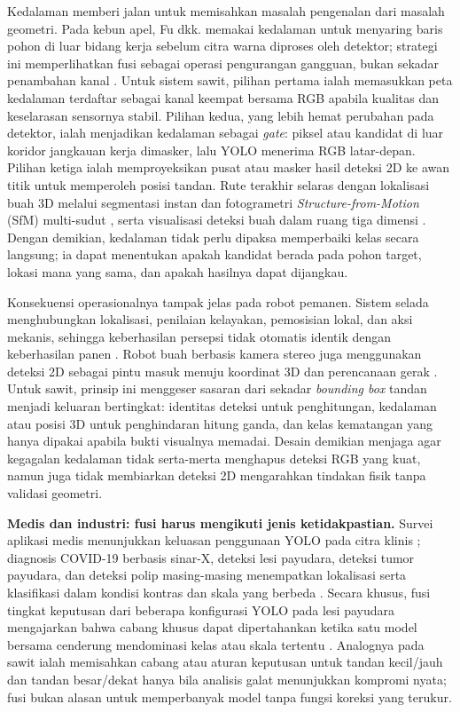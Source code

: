 Kedalaman memberi jalan untuk memisahkan masalah pengenalan dari masalah
geometri. Pada kebun apel, Fu dkk. memakai kedalaman untuk menyaring baris
pohon di luar bidang kerja sebelum citra warna diproses oleh detektor;
strategi ini memperlihatkan fusi sebagai operasi pengurangan gangguan,
bukan sekadar penambahan kanal \cite{fu2020apple}. Untuk sistem sawit,
pilihan pertama ialah memasukkan peta kedalaman terdaftar sebagai kanal
keempat bersama RGB apabila kualitas dan keselarasan sensornya stabil.
Pilihan kedua, yang lebih hemat perubahan pada detektor, ialah menjadikan
kedalaman sebagai \textit{gate}: piksel atau kandidat di luar koridor
jangkauan kerja dimasker, lalu YOLO menerima RGB latar-depan. Pilihan ketiga
ialah memproyeksikan pusat atau masker hasil deteksi 2D ke awan titik untuk
memperoleh posisi tandan. Rute terakhir selaras dengan lokalisasi buah 3D
melalui segmentasi instan dan fotogrametri \textit{Structure-from-Motion}
(SfM) multi-sudut \cite{genemola2020fruit3d}, serta visualisasi deteksi
buah dalam ruang tiga dimensi \cite{kang2020strawberry}. Dengan demikian,
kedalaman tidak perlu dipaksa memperbaiki kelas secara langsung; ia dapat
menentukan apakah kandidat berada pada pohon target, lokasi mana yang sama,
dan apakah hasilnya dapat dijangkau.

Konsekuensi operasionalnya tampak jelas pada robot pemanen. Sistem selada
menghubungkan lokalisasi, penilaian kelayakan, pemosisian lokal, dan aksi
mekanis, sehingga keberhasilan persepsi tidak otomatis identik dengan
keberhasilan panen \cite{birrell2020lettuce}. Robot buah berbasis kamera
stereo juga menggunakan deteksi 2D sebagai pintu masuk menuju koordinat 3D
dan perencanaan gerak \cite{onishi2019harvest}. Untuk sawit, prinsip ini
menggeser sasaran dari sekadar \textit{bounding box} tandan menjadi keluaran
bertingkat: identitas deteksi untuk penghitungan, kedalaman atau posisi 3D
untuk penghindaran hitung ganda, dan kelas kematangan yang hanya dipakai
apabila bukti visualnya memadai. Desain demikian menjaga agar kegagalan
kedalaman tidak serta-merta menghapus deteksi RGB yang kuat, namun juga tidak
membiarkan deteksi 2D mengarahkan tindakan fisik tanpa validasi geometri.

\textbf{Medis dan industri: fusi harus mengikuti jenis ketidakpastian.}
Survei aplikasi medis menunjukkan keluasan penggunaan YOLO pada citra klinis
\cite{qureshi2024medyolo}; diagnosis COVID-19 berbasis sinar-X,
deteksi lesi payudara, deteksi tumor payudara, dan deteksi polip masing-masing
menempatkan lokalisasi serta klasifikasi dalam kondisi kontras dan skala yang
berbeda \cite{alantari2020covid,baccouche2021breast,mohiyuddin2022breast,wan2023polyp}.
Secara khusus, fusi tingkat keputusan dari beberapa konfigurasi YOLO pada
lesi payudara mengajarkan bahwa cabang khusus dapat dipertahankan ketika satu
model bersama cenderung mendominasi kelas atau skala tertentu
\cite{baccouche2021breast}. Analognya pada sawit ialah memisahkan cabang atau
aturan keputusan untuk tandan kecil/jauh dan tandan besar/dekat hanya bila
analisis galat menunjukkan kompromi nyata; fusi bukan alasan untuk
memperbanyak model tanpa fungsi koreksi yang terukur.

